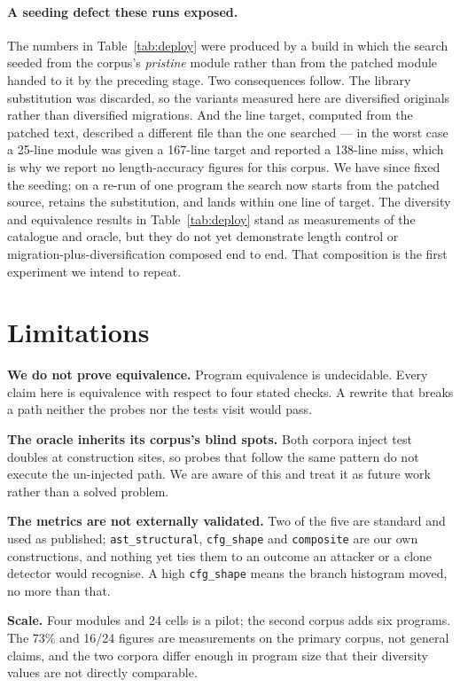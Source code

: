 \documentclass[10pt,twocolumn]{article}
\newcommand{\code}[1]{\texttt{\small #1}}
\begin{document}
\paragraph{A seeding defect these runs exposed.} The numbers in
Table~\ref{tab:deploy} were produced by a build in which the search seeded from
the corpus's \emph{pristine} module rather than from the patched module handed
to it by the preceding stage. Two consequences follow. The library substitution
was discarded, so the variants measured here are diversified originals rather
than diversified migrations. And the line target, computed from the patched
text, described a different file than the one searched --- in the worst case a
25-line module was given a 167-line target and reported a 138-line miss, which
is why we report no length-accuracy figures for this corpus. We have since
fixed the seeding; on a re-run of one program the search now starts from the
patched source, retains the substitution, and lands within one line of target.
The diversity and equivalence results in Table~\ref{tab:deploy} stand as
measurements of the catalogue and oracle, but they do not yet demonstrate
length control or migration-plus-diversification composed end to end. That
composition is the first experiment we intend to repeat.

\section{Limitations}
\label{sec:limits}

\textbf{We do not prove equivalence.} Program equivalence is undecidable. Every
claim here is equivalence with respect to four stated checks. A rewrite that
breaks a path neither the probes nor the tests visit would pass.

\textbf{The oracle inherits its corpus's blind spots.} Both corpora inject test
doubles at construction sites, so probes that follow the same pattern do not
execute the un-injected path. We are aware of this and treat it as future work
rather than a solved problem.

\textbf{The metrics are not externally validated.} Two of the five are standard
and used as published; \code{ast\_structural}, \code{cfg\_shape} and
\code{composite} are our own constructions, and nothing yet ties them to an
outcome an attacker or a clone detector would recognise. A high
\code{cfg\_shape} means the branch histogram moved, no more than that.

\textbf{Scale.} Four modules and 24 cells is a pilot; the second corpus adds six
programs. The 73\% and 16/24 figures are measurements on the primary corpus, not
general claims, and the two corpora differ enough in program size that their
diversity values are not directly comparable.
\end{document}
